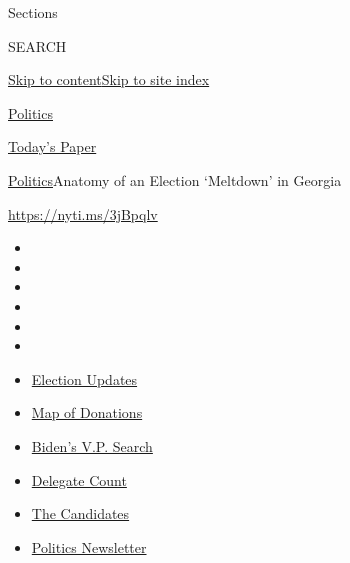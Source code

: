 Sections

SEARCH

\protect\hyperlink{site-content}{Skip to
content}\protect\hyperlink{site-index}{Skip to site index}

\href{https://www.nytimes3xbfgragh.onion/section/politics}{Politics}

\href{https://myaccount.nytimes3xbfgragh.onion/auth/login?response_type=cookie\&client_id=vi}{}

\href{https://www.nytimes3xbfgragh.onion/section/todayspaper}{Today's
Paper}

\href{/section/politics}{Politics}\textbar{}Anatomy of an Election
`Meltdown' in Georgia

\url{https://nyti.ms/3jBpqlv}

\begin{itemize}
\item
\item
\item
\item
\item
\item
\end{itemize}

\begin{itemize}
\item
  \href{https://www.nytimes3xbfgragh.onion/2020/07/24/us/elections/2020-presidential-election.html?action=click\&pgtype=Article\&state=default\&module=styln-elections-2020\&region=TOP_BANNER\&context=storylines_menu}{Election
  Updates}
\item
  \href{https://www.nytimes3xbfgragh.onion/interactive/2020/07/24/us/politics/trump-biden-campaign-donors.html?action=click\&pgtype=Article\&state=default\&module=styln-elections-2020\&region=TOP_BANNER\&context=storylines_menu}{Map
  of Donations}
\item
  \href{https://www.nytimes3xbfgragh.onion/article/biden-vice-president-2020.html?action=click\&pgtype=Article\&state=default\&module=styln-elections-2020\&region=TOP_BANNER\&context=storylines_menu}{Biden's
  V.P. Search}
\item
  \href{https://www.nytimes3xbfgragh.onion/interactive/2020/us/elections/delegate-count-primary-results.html?action=click\&pgtype=Article\&state=default\&module=styln-elections-2020\&region=TOP_BANNER\&context=storylines_menu}{Delegate
  Count}
\item
  \href{https://www.nytimes3xbfgragh.onion/interactive/2019/us/politics/2020-presidential-candidates.html?action=click\&pgtype=Article\&state=default\&module=styln-elections-2020\&region=TOP_BANNER\&context=storylines_menu}{The
  Candidates}
\item
  \href{https://www.nytimes3xbfgragh.onion/newsletters/politics?action=click\&pgtype=Article\&state=default\&module=styln-elections-2020\&region=TOP_BANNER\&context=storylines_menu}{Politics
  Newsletter}
\end{itemize}

